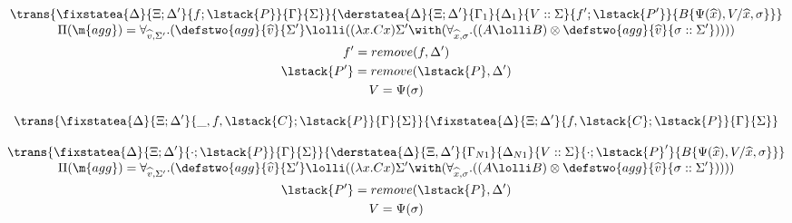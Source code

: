 
\[
\underset{
   \begin{gathered}
   \Pi(\m{agg}) = \forall_{\widehat{v}, \Sigma'}.
   (\defstwo{agg}{\widehat{v}}{\Sigma'} \lolli ((\lambda x. C x)\Sigma' \with (\forall_{\widehat{x}, \sigma}.
                                                ((A \lolli B) \otimes
                                                 \defstwo{agg}{\widehat{v}}{\sigma
                                                 ::\Sigma'})))) \\
   f' = remove(f, \Delta') \\
   \lstack{P'} = remove(\lstack{P}, \Delta') \\
   V = \Psi(\sigma)
   \end{gathered}
}
{
   \trans{
      \fixstatea{\Delta}{\Xi; \Delta'}{f; \lstack{P}}{\Gamma}{\Sigma}
   }
   {
      \derstatea{\Delta}{\Xi; \Delta'}{\Gamma_1}{\Delta_1}{V :: \Sigma}{f';
         \lstack{P'}}{B\{\Psi(\widehat{x}), V / \widehat{x}, \sigma \}}
   }
}
\]

\[
\trans{
   \fixstatea{\Delta}{\Xi; \Delta'}{\_, f, \lstack{C}; \lstack{P}}{\Gamma}{\Sigma}
}
{
   \fixstatea{\Delta}{\Xi; \Delta'}{f, \lstack{C}; \lstack{P}}{\Gamma}{\Sigma}
}
\]

\[
\underset{
   \begin{gathered}
   \Pi(\m{agg}) = \forall_{\widehat{v}, \Sigma'}.
   (\defstwo{agg}{\widehat{v}}{\Sigma'} \lolli ((\lambda x. C x)\Sigma' \with (\forall_{\widehat{x}, \sigma}.
                                                ((A \lolli B) \otimes
                                                 \defstwo{agg}{\widehat{v}}{\sigma
                                                 ::\Sigma'})))) \\
   \lstack{P'} = remove(\lstack{P}, \Delta') \\
   V = \Psi(\sigma)
   \end{gathered}
}
{
   \trans{
      \fixstatea{\Delta}{\Xi; \Delta'}{\cdot; \lstack{P}}{\Gamma}{\Sigma}
   }
   {
      \derstatea{\Delta}{\Xi, \Delta'}{\Gamma_{N1}}{\Delta_{N1}}{V :: \Sigma}{\cdot;
         \lstack{P}'}{B\{\Psi(\widehat{x}), V / \widehat{x}, \sigma \}}
   }
}
\]
